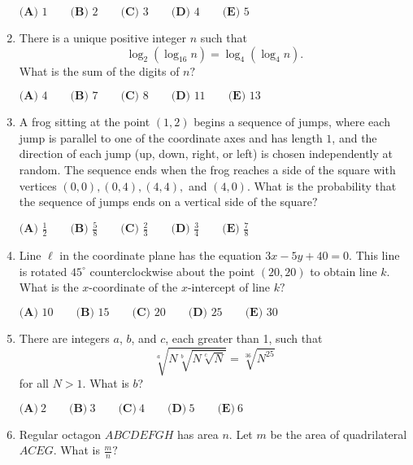 \documentclass{article}
\begin{document}
\begin{enumerate}[label=\arabic*., itemsep=0.5em]
$\textbf{(A) } 1 \qquad \textbf{(B) } 2 \qquad \textbf{(C) } 3 \qquad \textbf{(D) } 4 \qquad \textbf{(E) } 5$\par \vspace{0.5em}\item There is a unique positive integer $n$ such that
\begin{equation*}
\log_2{(\log_{16}{n})} = \log_4{(\log_4{n})}.
\end{equation*}
What is the sum of the digits of $n?$

$\textbf{(A) } 4 \qquad \textbf{(B) } 7 \qquad \textbf{(C) } 8 \qquad \textbf{(D) } 11 \qquad \textbf{(E) } 13$\par \vspace{0.5em}\item A frog sitting at the point $(1, 2)$ begins a sequence of jumps, where each jump is parallel to one of the coordinate axes and has length $1$, and the direction of each jump (up, down, right, or left) is chosen independently at random. The sequence ends when the frog reaches a side of the square with vertices $(0,0), (0,4), (4,4),$ and $(4,0)$. What is the probability that the sequence of jumps ends on a vertical side of the square$?$

$\textbf{(A) } \frac{1}{2} \qquad \textbf{(B) } \frac{5}{8} \qquad \textbf{(C) } \frac{2}{3} \qquad \textbf{(D) } \frac{3}{4} \qquad \textbf{(E) } \frac{7}{8}$\par \vspace{0.5em}\item Line $\ell$ in the coordinate plane has the equation $3x - 5y + 40 = 0$. This line is rotated $45^{\circ}$ counterclockwise about the point $(20, 20)$ to obtain line $k$. What is the $x$-coordinate of the $x$-intercept of line $k?$

$\textbf{(A) } 10 \qquad \textbf{(B) } 15 \qquad \textbf{(C) } 20 \qquad \textbf{(D) } 25 \qquad \textbf{(E) } 30$\par \vspace{0.5em}\item There are integers $a$, $b$, and $c$, each greater than 1, such that
\begin{equation*}
\sqrt[a]{N \sqrt[b]{N \sqrt[c]{N}}} = \sqrt[36]{N^{25}}
\end{equation*}
for all $N > 1$. What is $b$?

$\textbf{(A)}\ 2\qquad\textbf{(B)}\ 3\qquad\textbf{(C)}\ 4\qquad\textbf{(D)}\ 5\qquad\textbf{(E)}\ 6$\par \vspace{0.5em}\item Regular octagon $ABCDEFGH$ has area $n$. Let $m$ be the area of quadrilateral $ACEG$. What is $\tfrac{m}{n}?$


\end{enumerate}
\end{document}
